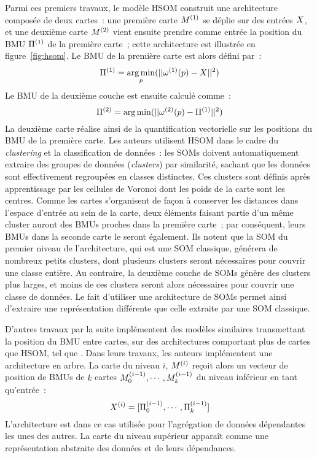 \documentclass[../main]{subfiles}
\begin{document}
Parmi ces premiers travaux, le modèle HSOM \cite{lampinen_clustering_1992} construit une architecture composée de deux cartes~: une première carte $M^{({1})}$ se déplie sur des entrées $X$, et une deuxième carte $M^{({2})}$ vient ensuite prendre comme entrée la position du BMU $\Pi^{({1})}$ de la première carte~; cette architecture est illustrée en figure~\ref{fig:hsom}.
Le BMU de la première carte est alors défini par~:
$$ \Pi^{({1})} = \operatorname*{arg\,min}_p(||\omega^{({1})}(p) - X || ^2)$$
Le BMU de la deuxième couche est ensuite calculé comme~:
$$ \Pi^{({2})}= \operatorname*{arg\,min}(||\omega^{({2})}(p) - \Pi^{({1})} || ^2)$$
La deuxième carte réalise ainsi de la quantification vectorielle sur les positions du BMU de la première carte. Les auteurs utilisent HSOM dans le cadre du \emph{clustering} et la classification de données~: les SOMs doivent automatiquement extraire des groupes de données (\emph{clusters}) par similarité, sachant que les données sont effectivement regroupées en classes distinctes. Ces clusters sont définis après apprentissage par les cellules de Voronoi dont les poids de la carte sont les centres.
Comme les cartes s'organisent de façon à conserver les distances dans l'espace d'entrée au sein de la carte, deux éléments faisant partie d'un même cluster auront des BMUs proches dans la première carte~; par conséquent, leurs BMUs dans la seconde carte le seront également. 
Ils notent que la SOM du premier niveau de l'architecture, qui est une SOM classique, générera de nombreux petits clusters, dont plusieurs clusters seront nécessaires pour couvrir une classe entière. Au contraire, la deuxième couche de SOMs génère des clusters plus larges, et moins de ces clusters seront alors nécessaires pour couvrir une classe de données.
Le fait d'utiliser une architecture de SOMs permet ainsi d'extraire une représentation différente que celle extraite par une SOM classique.


D'autres travaux par la suite implémentent des modèles similaires transmettant la position du BMU entre cartes, sur des architectures comportant plus de cartes que HSOM, tel que \cite{hagenauer_hierarchical_2013, Paplinski2005MultimodalFS}.
Dans leurs travaux, les auteurs implémentent une architecture en arbre. La carte du niveau $i$, $M^{({i})}$ reçoit alors un vecteur de position de BMUs de $k$ cartes $M_0^{({i-1})}, \cdots, M_k^{({i-1})}$  du niveau inférieur en tant qu'entrée~:
$$ X^{({i})} = [\Pi_0^{({i-1})}, \cdots, \Pi_k^{({i-1})}]$$
L'architecture est dans ce cas utilisée pour l'agrégation de données dépendantes les unes des autres.
La carte du niveau supérieur apparaît comme une représentation abstraite des données et de leurs dépendances.
\end{document}

